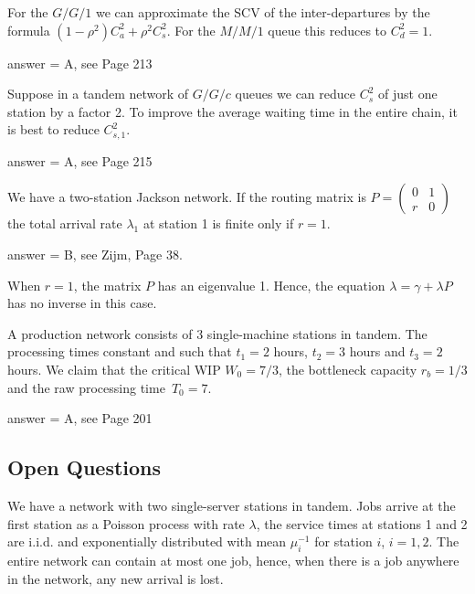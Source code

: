\begin{exercise}[201804]
For the $G/G/1$ we can approximate the SCV of the inter-departures by the formula $(1-\rho^2)C_a^2 + \rho^2 C_{s}^2$. For the $M/M/1$ queue this reduces to $C_{d}^2 = 1$.
\begin{solution}
answer = A, see Page 213
\end{solution}
\end{exercise}

\begin{exercise}[201804]
Suppose in a tandem network of $G/G/c$ queues we can reduce $C_{s}^2$ of just one station by a factor 2.  To improve the average waiting time in the entire chain, it is  best to reduce $C_{s,1}^2$.   
\begin{solution}
answer = A, see Page 215
\end{solution}
\end{exercise}

\begin{exercise}[201804]
We have a two-station Jackson network. If the routing matrix is $P=
\begin{pmatrix}
  0 & 1\\
r & 0
\end{pmatrix}$ the total arrival rate $\lambda_1$ at station 1 is finite only if $r=1$. 
\begin{solution}
answer = B, see Zijm, Page 38.

When $r=1$, the matrix $P$ has an eigenvalue 1. Hence, the equation $\lambda = \gamma + \lambda P$ has no inverse in this case.
\end{solution}
\end{exercise}


\begin{exercise}[201807]{1}
  A production network consists of 3 single-machine stations in
  tandem. The   processing times constant and such that $t_1=2$ hours, $t_2=3$ hours and $t_3=2$ hours.
We claim that  the critical WIP $W_0=7/3$, the bottleneck
  capacity $r_b=1/3$ and the raw processing time~$T_0=7$.
\begin{solution}
answer = A, see Page 201
\end{solution}
\end{exercise}


\subsection{Open Questions}

We have a network with two single-server stations in tandem.
Jobs arrive at the first station as a Poisson process with rate $\lambda$, the service times at stations 1 and 2 are i.i.d.
and exponentially distributed with mean $\mu_i^{-1}$ for station $i$, $i=1,2$.
The entire network can contain at most one job, hence, when there is a job anywhere in the network, any new arrival is lost.


